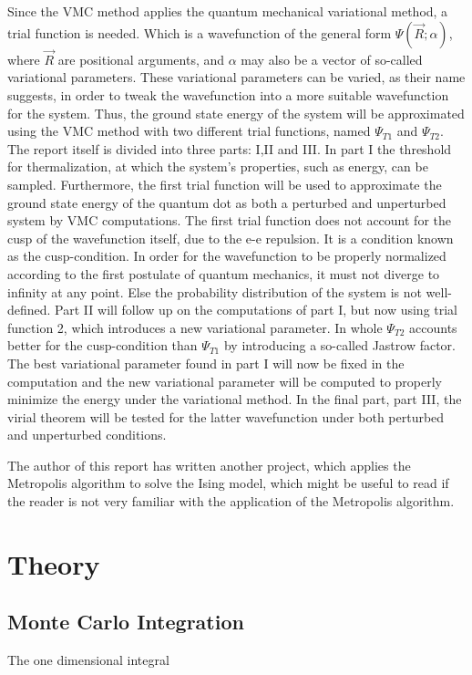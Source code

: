 \documentclass[aip,nobalancelastpage,
twocolumn,
rsi,%
 amsmath,amssymb,
 reprint,%
]{revtex4}
\begin{document}
Since the VMC method applies the quantum mechanical variational method, a trial function is needed. Which is a wavefunction of the general form $\Psi(\vec{R};\alpha)$, where $\vec{R}$ are positional arguments, and $\alpha$ may also be a vector of so-called variational parameters. These variational parameters can be varied, as their name suggests, in order to tweak the wavefunction into a more suitable wavefunction for the system. Thus, the ground state energy of the system will be approximated using the VMC method with two different trial functions, named $\Psi_{T1}$ and $\Psi_{T2}$. The report itself is divided into three parts: I,II and III. In part I the threshold for thermalization, at which the system's properties, such as energy, can be sampled. Furthermore, the first trial function will be used to approximate the ground state energy of the quantum dot as both a perturbed and unperturbed system by VMC computations. The first trial function does not account for the cusp of the wavefunction itself, due to the e-e repulsion. It is a condition known as the cusp-condition. In order for the wavefunction to be properly normalized according to the first postulate of quantum mechanics, it must not diverge to infinity at any point. Else the probability distribution of the system is not well-defined. Part II will follow up on the computations of part I, but now using trial function 2, which introduces a new variational parameter. In whole $\Psi_{T2}$ accounts better for the cusp-condition than $\Psi_{T1}$ by introducing a so-called Jastrow factor. The best variational parameter found in part I will now be fixed in the computation and the new variational parameter will be computed to properly minimize the energy under the variational method. In the final part, part III, the virial theorem will be tested for the latter wavefunction under both perturbed and unperturbed conditions.\par

The author of this report has written another project, which applies the Metropolis algorithm to solve the Ising model, which might be useful to read if the reader is not very familiar with the application of the Metropolis algorithm\cite{Project4}. 


\section{Theory}
\subsection{Monte Carlo Integration}
The one dimensional integral
\end{document}
